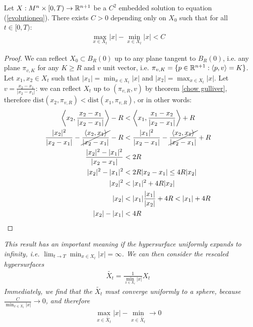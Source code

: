 \begin{cor}
	Let $X:M^n\times [0,T) \rightarrow \mathbb{R}^{n+1}$ be a $C^2$ embedded solution to equation (\ref{evolutioneq}). There exists $C>0$ depending only on $X_0$ such that for all $t\in[0, T)$: 
	\begin{align*}
		\max_{x\in X_t} |x| - \min_{x\in X_t} |x| < C
	\end{align*}\label{sandwich estimate}
\end{cor}
\begin{proof}
	We can reflect $X_0\subset B_R(0)$ up to any plane tangent to  $B_R(0)$, i.e. any plane $\pi_{v, K}$ for any $K\geq R$ and $v$ unit vector, i.e.  $\pi_{v, K}=\{p \in \mathbb{R}^{n+1} : \langle p, v \rangle = K\}$. Let $x_1, x_2\in X_t$ such that $|x_1|=\min_{x\in X_t} |x|$ and  $|x_2|=\max_{x\in X_t} |x|$. Let $v=\frac{x_2-x_1}{\vert x_2-x_1 \vert}$: we can reflect $X_t$ up to $(\pi_{v, R}, v)$ by theorem \ref{chow gulliver}, therefore $\mathrm{dist}(x_2, \pi_{v, R}) < \mathrm{dist}(x_1, \pi_{v, R})$, or in other words:
	\begin{align*}
		 \left\langle x_2, \frac{x_2-x_1}{\vert x_2-x_1 \vert} \right\rangle - R &< 
		 \left\langle x_1, \frac{x_1-x_2}{\vert x_2-x_1 \vert} \right\rangle + R\\
		 \frac{|x_2|^2}{\vert x_2-x_1 \vert} - \cancel{\frac{\left\langle x_2, x_1\right\rangle}{\vert x_2-x_1 \vert}}  - R &< 
		 \frac{\vert x_1\vert^2}{\vert x_2-x_1 \vert} - \cancel{\frac{\left\langle x_2, x_1\right\rangle}{\vert x_2-x_1 \vert}}  + R\\
		 \frac{|x_2|^2 - |x_1|^2}{\vert x_2-x_1 \vert} &< 
		  2R\\
		  |x_2|^2 - |x_1|^2 &< 
		  2R \vert x_2-x_1 \vert \leq 4R |x_2|\\
		  |x_2|^2 &<|x_1|^2 + 4R |x_2|\\
		  |x_2| &< |x_1| \frac{|x_1|}{|x_2|} + 4R < |x_1| + 4R\\
		  |x_2| -|x_1| &<4R
	\end{align*}
\end{proof}

\begin{oss}
	\em This result has an important meaning if the hypersurface uniformly expands to infinity, i.e. $\lim_{t\rightarrow T}\min_{x\in X_t} |x| =\infty$. We can then consider the rescaled hypersurfaces 
	\begin{align*}
		\widetilde{X_t} = \frac{1}{\min_{x\in X_t} |x|} X_t
	\end{align*}
	Immediately, we find that  the $\widetilde{X_t}$ must converge uniformly to a sphere, because $\frac{C}{\min_{x\in X_t} |x|}\rightarrow 0$, and therefore 
	\begin{align*}
		\max_{x\in \widetilde{X_t}} |x| - \min_{x\in \widetilde{X_t}}\rightarrow 0
	\end{align*}
\end{oss}

